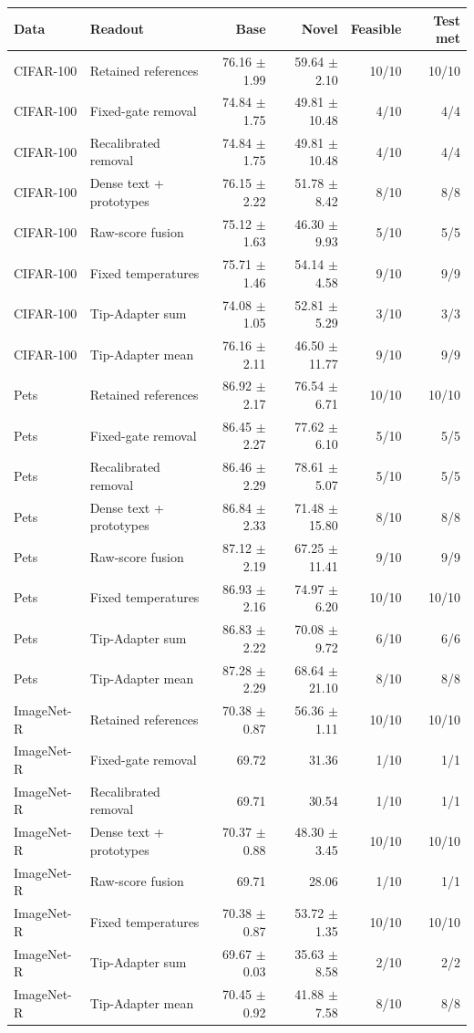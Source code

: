 \begin{tabular}{llrrrr}
\toprule
Data & Readout & Base & Novel & Feasible & Test met \\
\midrule
CIFAR-100 & Retained references & 76.16 $\pm$ 1.99 & 59.64 $\pm$ 2.10 & 10/10 & 10/10 \\
CIFAR-100 & Fixed-gate removal & 74.84 $\pm$ 1.75 & 49.81 $\pm$ 10.48 & 4/10 & 4/4 \\
CIFAR-100 & Recalibrated removal & 74.84 $\pm$ 1.75 & 49.81 $\pm$ 10.48 & 4/10 & 4/4 \\
CIFAR-100 & Dense text + prototypes & 76.15 $\pm$ 2.22 & 51.78 $\pm$ 8.42 & 8/10 & 8/8 \\
CIFAR-100 & Raw-score fusion & 75.12 $\pm$ 1.63 & 46.30 $\pm$ 9.93 & 5/10 & 5/5 \\
CIFAR-100 & Fixed temperatures & 75.71 $\pm$ 1.46 & 54.14 $\pm$ 4.58 & 9/10 & 9/9 \\
CIFAR-100 & Tip-Adapter sum & 74.08 $\pm$ 1.05 & 52.81 $\pm$ 5.29 & 3/10 & 3/3 \\
CIFAR-100 & Tip-Adapter mean & 76.16 $\pm$ 2.11 & 46.50 $\pm$ 11.77 & 9/10 & 9/9 \\
\midrule
Pets & Retained references & 86.92 $\pm$ 2.17 & 76.54 $\pm$ 6.71 & 10/10 & 10/10 \\
Pets & Fixed-gate removal & 86.45 $\pm$ 2.27 & 77.62 $\pm$ 6.10 & 5/10 & 5/5 \\
Pets & Recalibrated removal & 86.46 $\pm$ 2.29 & 78.61 $\pm$ 5.07 & 5/10 & 5/5 \\
Pets & Dense text + prototypes & 86.84 $\pm$ 2.33 & 71.48 $\pm$ 15.80 & 8/10 & 8/8 \\
Pets & Raw-score fusion & 87.12 $\pm$ 2.19 & 67.25 $\pm$ 11.41 & 9/10 & 9/9 \\
Pets & Fixed temperatures & 86.93 $\pm$ 2.16 & 74.97 $\pm$ 6.20 & 10/10 & 10/10 \\
Pets & Tip-Adapter sum & 86.83 $\pm$ 2.22 & 70.08 $\pm$ 9.72 & 6/10 & 6/6 \\
Pets & Tip-Adapter mean & 87.28 $\pm$ 2.29 & 68.64 $\pm$ 21.10 & 8/10 & 8/8 \\
\midrule
ImageNet-R & Retained references & 70.38 $\pm$ 0.87 & 56.36 $\pm$ 1.11 & 10/10 & 10/10 \\
ImageNet-R & Fixed-gate removal & 69.72 & 31.36 & 1/10 & 1/1 \\
ImageNet-R & Recalibrated removal & 69.71 & 30.54 & 1/10 & 1/1 \\
ImageNet-R & Dense text + prototypes & 70.37 $\pm$ 0.88 & 48.30 $\pm$ 3.45 & 10/10 & 10/10 \\
ImageNet-R & Raw-score fusion & 69.71 & 28.06 & 1/10 & 1/1 \\
ImageNet-R & Fixed temperatures & 70.38 $\pm$ 0.87 & 53.72 $\pm$ 1.35 & 10/10 & 10/10 \\
ImageNet-R & Tip-Adapter sum & 69.67 $\pm$ 0.03 & 35.63 $\pm$ 8.58 & 2/10 & 2/2 \\
ImageNet-R & Tip-Adapter mean & 70.45 $\pm$ 0.92 & 41.88 $\pm$ 7.58 & 8/10 & 8/8 \\
\bottomrule
\end{tabular}
